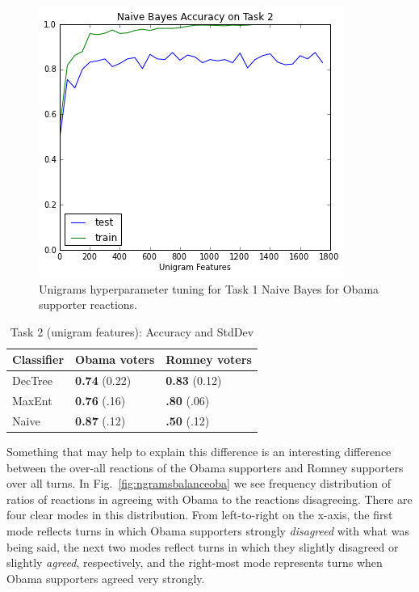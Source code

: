 \begin{figure}[]
	\centering
	\includegraphics[scale=0.60]{Figures/ngrams_hyperparam_task2.png}
	\caption{Unigrams hyperparameter tuning for Task 1 Naive Bayes for Obama supporter reactions.}
	\label{fig:ngramstask2hyperparam}
\end{figure}

\begin{table}[]
\begin{centering}
\begin{tabular}{ l | l | l }
Classifier & Obama voters & Romney voters \\
\hline
DecTree & \textbf{0.74} (0.22) &  \textbf{0.83} (0.12) \\
MaxEnt & \textbf{0.76} (.16) &  \textbf{.80} (.06) \\
Naive & \textbf{0.87} (.12) &  \textbf{.50} (.12) \\
\end{tabular}
\caption{Task 2 (unigram features): Accuracy and StdDev}
\label{tab:task2unigrams}
\end{centering}
\end{table}

Something that may help to explain this difference is an interesting difference between the over-all reactions of the Obama supporters and Romney supporters over all turns.  In Fig.~\ref{fig:ngramsbalanceoba} we see frequency distribution of ratios of reactions in agreeing with Obama to the reactions disagreeing.  There are four clear modes in this distribution.  From left-to-right on the x-axis, the first mode reflects turns in which Obama supporters strongly \emph{disagreed} with what was being said, the next two modes reflect turns in which they slightly disagreed or slightly \emph{agreed}, respectively, and the right-most mode represents turns when Obama supporters agreed very strongly.

